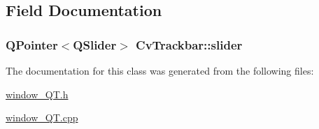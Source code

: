 \subsection{Field Documentation}
\hypertarget{classCvTrackbar_afc7525a204cd578c21b23b842cbe28d8}{
\subsubsection[{slider}]{\setlength{\rightskip}{0pt plus 5cm}Q\-Pointer$<$Q\-Slider$>$ Cv\-Trackbar\-::slider}}\label{classCvTrackbar_afc7525a204cd578c21b23b842cbe28d8}


The documentation for this class was generated from the following files\-:\begin{DoxyCompactItemize}
\item 
\hyperlink{window__QT_8h}{window\-\_\-\-Q\-T.\-h}\item 
\hyperlink{window__QT_8cpp}{window\-\_\-\-Q\-T.\-cpp}\end{DoxyCompactItemize}
